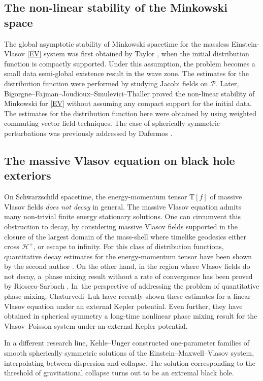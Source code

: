 \documentclass[10pt]{amsart}
\theoremstyle{plain}
\theoremstyle{definition}
\begin{document}
\subsection{The non-linear stability of the Minkowski space}

The global asymptotic stability of Minkowski spacetime for the massless Einstein-Vlasov \eqref{EV} system was first obtained by Taylor \cite{T}, when the initial distribution function is compactly supported. Under this assumption, the problem becomes a small data semi-global existence result in the wave zone. The estimates for the distribution function were performed by studying Jacobi fields on $\mathcal{P}$. Later, Bigorgne--Fajman--Joudioux--Smulevici--Thaller \cite{BFJST} proved the non-linear stability of Minkowski for \eqref{EV} without assuming any compact support for the initial data. The estimates for the distribution function here were obtained by using weighted commuting vector field techniques. The case of spherically symmetric perturbations was previously addressed by Dafermos \cite{D06}.

\subsection{The massive Vlasov equation on black hole exteriors}

On Schwarzschild spacetime, the energy-momentum tensor $\mathrm{T}[f]$ of massive Vlasov fields \emph{does not decay} in general. The massive Vlasov equation admits many non-trivial finite energy stationary solutions. One can circumvent this obstruction to decay, by considering massive Vlasov fields supported in the closure of the largest domain of the mass-shell where timelike geodesics either cross $\mathcal{H}^+$, or escape to infinity. For this class of distribution functions, quantitative decay estimates for the energy-momentum tensor have been shown by the second author \cite{V24}. On the other hand, in the region where Vlasov fields do not decay, a~phase mixing result without a rate of convergence has been proved by Rioseco-Sarbach \cite{RS20}. In~the perspective of addressing the problem of quantitative phase mixing, Chaturvedi--Luk \cite{CL24} have recently shown these estimates for a linear Vlasov equation under an external Kepler potential. Even further, they have obtained in spherical symmetry a long-time nonlinear phase mixing result for the Vlasov--Poisson system under an external Kepler potential.

In a different research line, Kehle--Unger \cite{KU24} constructed one-parameter families of smooth spherically symmetric solutions of the Einstein--Maxwell--Vlasov system, interpolating between dispersion and collapse. The solution corresponding to the threshold of gravitational collapse turns out to be an extremal black hole.
\end{document}
